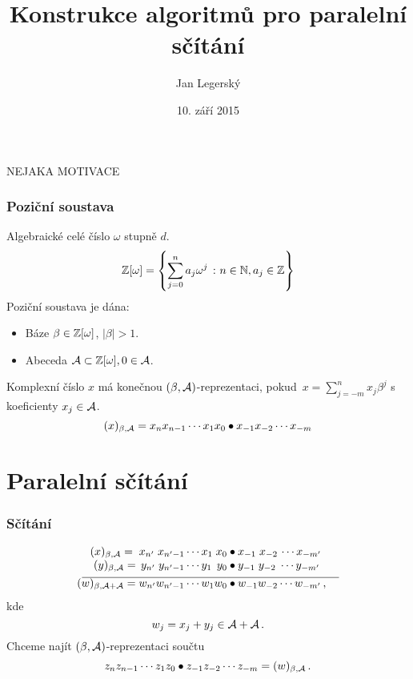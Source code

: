 \documentclass[11pt]{beamer}
\title{Konstrukce algoritmů pro paralelní sčítání}
\institute{TIGR \\
                \url{jan.legersky@gmail.com} \\
					\rule{0cm}{0mm} \\
					\rule{0cm}{0mm} \\
					Obhajoba výzkumného úkolu}
\author{Jan Legersk\'y}
\date{10. září 2015}
\begin{document}
\begin{frame}
  \titlepage
\end{frame}

\begin{frame}
  \tableofcontents
\end{frame}


\begin{frame}
NEJAKA MOTIVACE
\end{frame}

\begin{frame}
  \frametitle{Poziční soustava}
  Algebraické celé číslo $\omega$ stupně $d$.
  $$\mathbb{Z}[\omega]= \left\{\sum_{j=0}^{n} a_j \omega^j\ \colon n\in\mathbb{N},  a_j \in \mathbb{Z} \right\}$$
  \pause
  Poziční soustava je dána:
  \begin{itemize}
    \item Báze $\beta \in \mathbb{Z}[\omega]$, $|\beta|>1$.
    \item Abeceda $\mathcal{A} \subset \mathbb{Z}[\omega] , 0\in \mathcal{A}$. 
  \end{itemize}
  
  Komplexní číslo $x$ má konečnou  $(\beta, \mathcal{A})$-reprezentaci, pokud~$x=\sum_{j=-m}^n x_j \beta^j$ s koeficienty $x_j\in\mathcal{A}$.
  $$
    (x)_{\beta,\mathcal{A}}=x_n x_{n-1}\cdots x_1 x_0 \bullet x_{-1} x_{-2} \cdots x_{-m}
  $$ 
\end{frame}

\section{Paralelní sčítání}
\begin{frame}
  \frametitle{Sčítání}
    \begin{align*}
  (x)_{\beta,\A}=\;x_{n'} \;x_{{n'}-1}\cdots x_1 \;x_0 &\bullet x_{-1} \;x_{-2}\, \cdots x_{-m'} \\[-3pt]
  (y)_{\beta,\A}=\,y_{n'} \;y_{{n'}-1}\cdots y_1 \,\;y_0 &\bullet y_{-1} \;y_{-2} \;\cdots y_{-m'} \\[-7pt]
    \line(1,0){130} & \line(1,0){100} \\[-7pt]
  (w)_{\beta,\A+\A}=w_{n'} w_{{n'}-1}\cdots w_1 w_0 &\bullet w_{-1} w_{-2} \cdots w_{-m'}\,,
  \end{align*}
  kde
  $$
    w_j=x_j+y_j \in \mathcal{A} +\mathcal{A}\,.
  $$
  \pause
  Chceme najít $(\beta,\mathcal{A})$-reprezentaci součtu
  $$
    z_{n} z_{n-1}\cdots z_1 z_0 \bullet z_{-1} z_{-2} \cdots z_{-m}=(w)_{\beta,\mathcal{A}}\,.
  $$ 
\end{frame}
\end{document}
